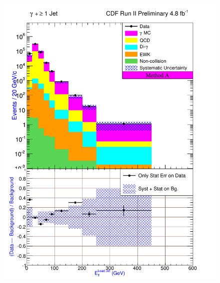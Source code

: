 \begin{figure}[h!]
{\includegraphics[keepaspectratio=true, scale=\resultsHistScale]{G30Jets_MtdA_plot1_Et_j1.pdf}
}

\end{figure}
